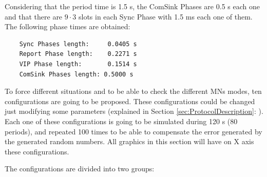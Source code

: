 Considering that the period time is 1.5 s, the ComSink Phases are 0.5 s each one and that there are $9\cdot3$ slots in each Sync Phase with 
1.5 ms each one of them. The following phase times are obtained:

\begin{verbatim}
    Sync Phases length:     0.0405 s
    Report Phase length:    0.2271 s
    VIP Phase length:       0.1514 s
    ComSink Phases length: 0.5000 s
\end{verbatim}

To force different situations and to be able to check the different \acp{MN} modes, ten configurations are going to be proposed. These 
configurations could be changed just modifying some parameters (explained in Section \ref{sec:ProtocolDescription}: ). 
Each one of these configurations is going to be simulated during 120 s (80 periods), and repeated 100 times to be able to compensate the error 
generated by the generated random numbers. All graphics in this section will have on X axis these configurations.

The configurations are divided into two groups:

